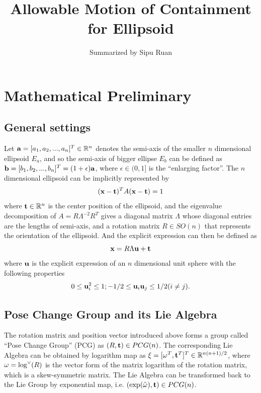 \documentclass{article}
\author{Summarized by Sipu Ruan}
\title{Allowable Motion of Containment for Ellipsoid}
\begin{document}
\maketitle

\section{Mathematical Preliminary}
\subsection{General settings}
Let ${\bf a}=[a_1, a_2, ..., a_n]^T \in \mathbb{R}^n$ denotes the semi-axis of the smaller $n$ dimensional ellipsoid $E_a$, and so the semi-axis of bigger ellipse $E_b$ can be defined as ${\bf b}=[b_1,b_2, ..., b_n]^T=(1+\epsilon){\bf a}$, where $\epsilon \in (0,1]$ is the ``enlarging factor''. The $n$ dimensional ellipsoid can be implicitly represented by
\begin{equation}
({\bf x-t})^T A ({\bf x-t}) = 1 
\end{equation}
where ${\bf t} \in \mathbb{R}^n$ is the center position of the ellipsoid, and the eigenvalue decomposition of $A = R \Lambda^{-2} R^T$ gives a diagonal matrix $\Lambda$ whose diagonal entries are the lengths of semi-axis, and a rotation matrix $R \in SO(n)$ that represents the orientation of the ellipsoid. And the explicit expression can then be defined as
\begin{equation}
{\bf x} = R \Lambda {\bf u} + {\bf t}
\end{equation}
where ${\bf u}$ is the explicit expression of an $n$ dimensional unit sphere with the following properties
\begin{equation}
0 \leq {\bf u}_i^2 \leq 1; -1/2 \leq {\bf u}_i {\bf u}_j \leq 1/2 (i\neq j).
\end{equation}

\subsection{Pose Change Group and its Lie Algebra}
The rotation matrix and position vector introduced above forms a group called ``Pose Change Group'' (PCG) as $(R,{\bf t}) \in PCG(n)$. The corresponding Lie Algebra can be obtained by logarithm map as ${\bf \xi} = [{\bf \omega}^T, {\bf t}^T]^T \in \mathbb{R}^{n(n+1)/2}$, where ${\bf \omega}=\log^\vee(R)$ is the vector form of the matrix logarithm of the rotation matrix, which is a skew-symmetric matrix. The Lie Algebra can be transformed back to the Lie Group by exponential map, i.e. $(\exp(\hat{\bf \omega}), {\bf t}) \in PCG(n)$.
\end{document}
